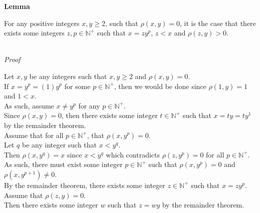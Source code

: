 \documentclass[a4paper,12pt]{article}
\begin{document}
\begin{tcolorbox}
\textbf{Lemma}

\noindent For any positive integers $x, y \geq 2$, such that $\rho(x,y) = 0$, it is the case that there exists some integers $z, p \in \mathbb{N}^+$ such that $x = zy^p$, $z < x$ and $\rho(z, y) > 0$.\\

\end{tcolorbox}


\noindent \\
\textit{Proof}
\label{proof:remainder_powers}
\hypertarget{proof:remainder_powers}{}

\noindent Let $x, y$ be any integers such that $x, y \geq 2$ and $\rho(x, y) = 0$.\\

\noindent If $x = y^p = (1)y^p$ for some $p \in \mathbb{N}^+$, then we would be done since $\rho(1, y) = 1$ and $1 < x$.\\

\noindent As such, assume $x \neq y^p$ for any $p \in \mathbb{N}^+$.\\

\noindent Since $\rho(x, y) = 0$, then there exists some integer $t \in \mathbb{N}^+$ such that $x = ty = ty^1$ by the remainder theorem.\\

\noindent Assume that for all $p \in \mathbb{N}^+$, that $\rho(x, y^p) = 0$.\\

\noindent Let $q$ be any integer such that $x < y^q$.\\

\noindent Then $\rho(x, y^q) = x$ since $x < y^q$ which contradicts $\rho(z, y^p) = 0$ for all $p \in \mathbb{N}^+$.\\

\noindent As such, there must exist some integer $p \in \mathbb{N}^+$ such that $\rho(x, y^p) = 0$ and $\rho(x, y^{p + 1}) \neq 0$.\\

\noindent By the remainder theorem, there exists some integer $z \in \mathbb{N}^+$ such that $x = zy^p$.\\

\noindent Assume that $\rho(z, y) = 0$.\\

\noindent Then there exists some integer $w$ such that $z = wy$ by the remainder theorem.\\
\end{document}
